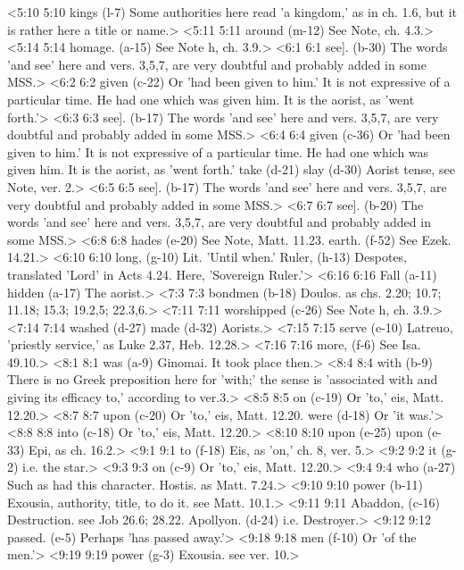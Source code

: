 <5:10 5:10  kings (l-7)  Some authorities here read 'a kingdom,' as in ch. 1.6, but it  is rather here a title or name.>
<5:11 5:11  around (m-12)  See Note, ch. 4.3.>
<5:14 5:14  homage. (a-15)  See Note h, ch. 3.9.>
<6:1 6:1  see]. (b-30)  The words 'and see' here and vers. 3,5,7, are very doubtful  and probably added in some MSS.>
<6:2 6:2  given (c-22)  Or 'had been given to him.' It is not expressive of a  particular time. He had one which was given him. It is the  aorist, as 'went forth.'>
<6:3 6:3  see]. (b-17)  The words 'and see' here and vers. 3,5,7, are very doubtful  and probably added in some MSS.>
<6:4 6:4  given (c-36)  Or 'had been given to him.' It is not expressive of a  particular time. He had one which was given him. It is the  aorist, as 'went forth.'
  take (d-21)  slay (d-30)
  Aorist tense, see Note, ver. 2.>
<6:5 6:5  see]. (b-17)  The words 'and see' here and vers. 3,5,7, are very doubtful  and probably added in some MSS.>
<6:7 6:7  see]. (b-20)  The words 'and see' here and vers. 3,5,7, are very doubtful  and probably added in some MSS.>
<6:8 6:8  hades (e-20)  See Note, Matt. 11.23.
  earth. (f-52)  See Ezek. 14.21.>
<6:10 6:10  long, (g-10)  Lit. 'Until when.'
  Ruler, (h-13)  Despotes, translated 'Lord' in Acts 4.24. Here, 'Sovereign  Ruler.'>
<6:16 6:16  Fall (a-11)  hidden (a-17)
  The aorist.>
<7:3 7:3  bondmen (b-18)  Doulos. as chs. 2.20; 10.7; 11.18; 15.3; 19.2,5; 22.3,6.>
<7:11 7:11  worshipped (c-26)  See Note h, ch. 3.9.>
<7:14 7:14  washed (d-27)  made (d-32)
  Aorists.>
<7:15 7:15  serve (e-10)  Latreuo, 'priestly service,' as Luke 2.37, Heb. 12.28.>
<7:16 7:16  more, (f-6)  See Isa. 49.10.>
<8:1 8:1  was (a-9)  Ginomai. It took place then.>
<8:4 8:4  with (b-9)  There is no Greek preposition here for 'with;' the sense is  'associated with and giving its efficacy to,' according to  ver.3.>
<8:5 8:5  on (c-19)  Or 'to,' eis, Matt. 12.20.>
<8:7 8:7  upon (c-20)  Or 'to,' eis, Matt. 12.20.
  were (d-18)  Or 'it was.'>
<8:8 8:8  into (c-18)  Or 'to,' eis, Matt. 12.20.>
<8:10 8:10  upon (e-25)  upon (e-33)
  Epi, as ch. 16.2.>
<9:1 9:1  to (f-18)  Eis, as 'on,' ch. 8, ver. 5.>
<9:2 9:2  it (g-2)  i.e. the star.>
<9:3 9:3  on (c-9)  Or 'to,' eis, Matt. 12.20.>
<9:4 9:4  who (a-27)  Such as had this character. Hostis. as Matt. 7.24.>
<9:10 9:10  power (b-11)  Exousia, authority, title, to do it. see Matt. 10.1.>
<9:11 9:11  Abaddon, (c-16)  Destruction. see Job 26.6; 28.22.
  Apollyon. (d-24)  i.e. Destroyer.>
<9:12 9:12  passed. (e-5)  Perhaps 'has passed away.'>
<9:18 9:18  men (f-10)  Or 'of the men.'>
<9:19 9:19  power (g-3)  Exousia. see ver. 10.>
